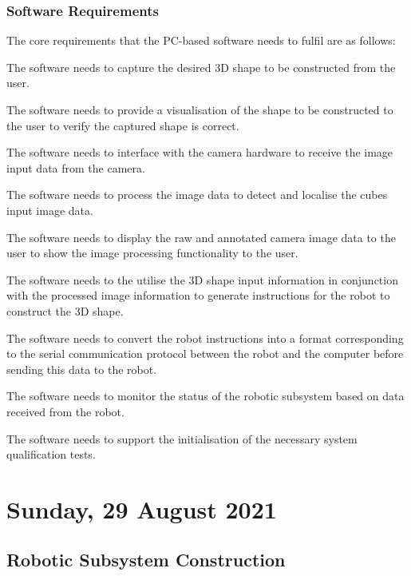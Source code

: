 \subsubsection{Software Requirements}

The core requirements that the PC-based software needs to fulfil are as follows:

\begin{compactitem}
	\item The software needs to capture the desired 3D shape to be constructed from the user.
	\item The software needs to provide a visualisation of the shape to be constructed to the user to verify the captured shape is correct.
	\item The software needs to interface with the camera hardware to receive the image input data from the camera.
	\item The software needs to process the image data to detect and localise the cubes input image data.
	\item The software needs to display the raw and annotated camera image data to the user to show the image processing functionality to the user.
	\item The software needs to the utilise the 3D shape input information in conjunction with the processed image information to generate instructions for the robot to construct the 3D shape.
	\item The software needs to convert the robot instructions into a format corresponding to the serial communication protocol between the robot and the computer before sending this data to the robot.
	\item The software needs to monitor the status of the robotic subsystem based on data received from the robot.
	\item The software needs to support the initialisation of the necessary system qualification tests.
	
\end{compactitem}

\pendsign

\section[2021/08/29]{Sunday, 29 August 2021}

\subsection{Robotic Subsystem Construction}

